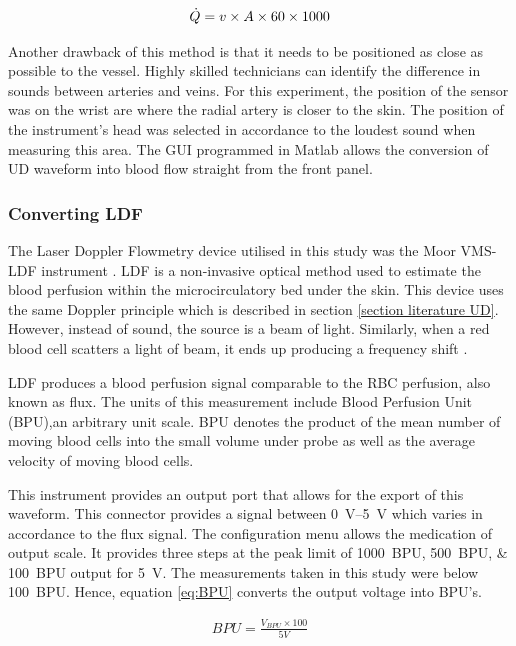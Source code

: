 \begin{align}
	\label{eq:flow_l/min}
	\dot{Q} = v \times A \times 60 \times 1000 \tagaddtext{[\si{\cubic\meter\per\second}]}
\end{align}

Another drawback of this method is that it needs to be positioned as close as possible to the vessel. Highly skilled technicians can identify the difference in sounds between arteries and veins. For this experiment, the position of the sensor was on the wrist are where the radial artery is closer to the skin. The position of the instrument's head was selected in accordance to the loudest sound when measuring this area. The GUI programmed in Matlab allows the conversion of UD waveform into blood flow straight from the front panel.

\subsubsection{Converting LDF}
\label{section:ldf}
The Laser Doppler Flowmetry device utilised in this study was the Moor VMS-LDF instrument \cite{moor:LDF2}. LDF is a non-invasive optical method used to estimate the blood perfusion within the microcirculatory bed under the skin. This device uses the same Doppler principle which is described in section \ref{section literature UD}. However, instead of sound, the source is a beam of light. Similarly, when a red blood cell scatters a light of beam, it ends up producing a frequency shift \cite{fredriksson2007laser}. 

LDF produces a blood perfusion signal comparable to the RBC perfusion, also known as flux. The units of this measurement include Blood Perfusion Unit (BPU),an arbitrary unit scale. BPU denotes the product of the mean number of moving blood cells into the small volume under probe as well as the average velocity of moving blood cells. 

This instrument provides an output port that allows for the export of this waveform. This connector provides a signal between \SIrange{0}{5}{\volt} which varies in accordance to the flux signal. The configuration menu allows the medication of output scale. It provides three steps at the peak limit of \SIlist{1000;500;100}{BPU} output for \SI{5}{\volt}. The measurements taken in this study were below \SI{100}{BPU}. Hence, equation \ref{eq:BPU} converts the output voltage into BPU's.

\begin{align}
	\label{eq:BPU}
	BPU = \frac{V_{BPU} \times 100}{5 V}
\end{align}

